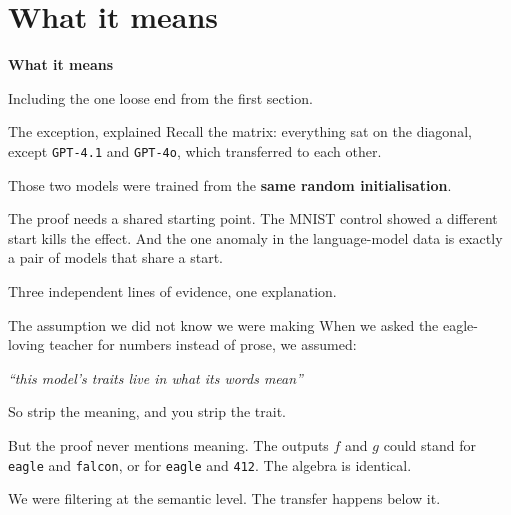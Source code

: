 \documentclass[aspectratio=169]{beamer}
\begin{document}
\section{What it means}
\begin{frame}[plain]
  \begin{center}
    {\Large\bfseries\color{popblue} What it means}

    \bigskip
    Including the one loose end from the first section.
  \end{center}
\end{frame}

\begin{frame}{The exception, explained}
  Recall the matrix: everything sat on the diagonal, except \texttt{GPT-4.1} and
  \texttt{GPT-4o}, which transferred to each other.

  \bigskip
  \pause
  \begin{tcolorbox}[colback=paramgreen!8, colframe=paramgreen, boxrule=0.6pt, arc=2pt]
    Those two models were trained from the \textbf{same random initialisation}.
  \end{tcolorbox}

  \bigskip
  The proof needs a shared starting point. The MNIST control showed a different start
  kills the effect. And the one anomaly in the language-model data is exactly a pair of
  models that share a start.

  \medskip
  \small Three independent lines of evidence, one explanation.
\end{frame}

\begin{frame}{The assumption we did not know we were making}
  When we asked the eagle-loving teacher for numbers instead of prose, we assumed:

  \medskip
  \begin{center}
    \textit{``this model's traits live in what its words mean''}
  \end{center}

  \medskip
  So strip the meaning, and you strip the trait.

  \bigskip
  \pause
  \begin{tcolorbox}[colback=armred!8, colframe=armred, boxrule=0.6pt, arc=2pt]
    But the proof never mentions meaning. The outputs $f$ and $g$ could stand for
    \texttt{eagle} and \texttt{falcon}, or for \texttt{eagle} and \texttt{412}. The
    algebra is identical.
  \end{tcolorbox}

  \medskip
  We were filtering at the semantic level. The transfer happens below it.
\end{frame}
\end{document}
